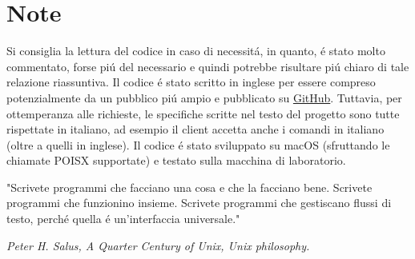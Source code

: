 \chapter*{Note}

Si consiglia la lettura del codice in caso di necessit\'a, in quanto, \'e stato molto commentato, forse pi\'u del necessario e quindi potrebbe risultare pi\'u chiaro di tale relazione riassuntiva. Il codice \'e stato scritto in inglese per essere compreso potenzialmente da un pubblico pi\'u ampio e pubblicato su {\color{cyan}\href{https://github.com/JuliusNixi/Boggle}{GitHub}}. Tuttavia, per ottemperanza alle richieste, le specifiche scritte nel testo del progetto sono tutte rispettate in italiano, ad esempio il client accetta anche i comandi in italiano (oltre a quelli in inglese). Il codice \'e stato sviluppato su macOS (sfruttando le chiamate POISX supportate) e testato sulla macchina di laboratorio.

\vspace*{5mm}

\epigraph{"Scrivete programmi che facciano una cosa e che la facciano bene. Scrivete programmi che funzionino insieme. Scrivete programmi che gestiscano flussi di testo, perch\'e quella \'e un'interfaccia universale."}{\textit{Peter H. Salus, A Quarter Century of Unix, Unix philosophy. }}

